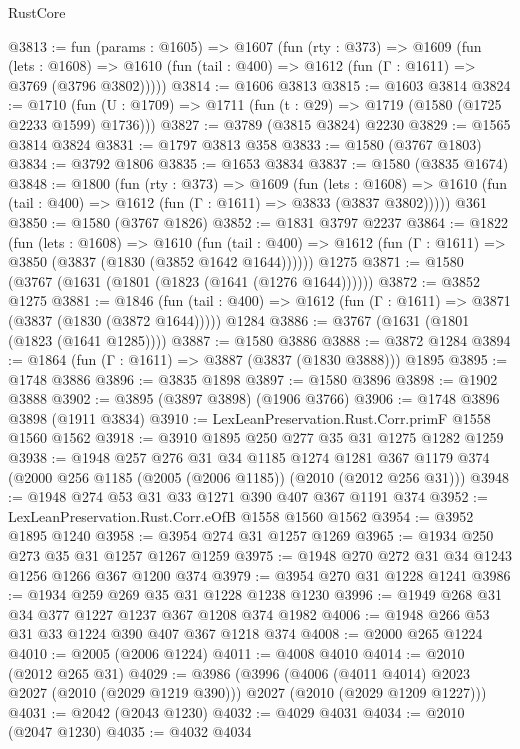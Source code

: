 \begin{lexlean}{RustCore}
\begin{coremodule}
@3813 := fun (params : @1605) =>
  @1607
    (fun (rty : @373) =>
    @1609
      (fun (lets : @1608) =>
      @1610 (fun (tail : @400) => @1612 (fun (Γ : @1611) => @3769 (@3796 @3802)))))
@3814 := @1606 @3813
@3815 := @1603 @3814
@3824 := @1710 (fun (U : @1709) => @1711 (fun (t : @29) => @1719 (@1580 (@1725 @2233 @1599) @1736)))
@3827 := @3789 (@3815 @3824) @2230
@3829 := @1565 @3814 @3824
@3831 := @1797 @3813 @358
@3833 := @1580 (@3767 @1803)
@3834 := @3792 @1806
@3835 := @1653 @3834
@3837 := @1580 (@3835 @1674)
@3848 := @1800
    (fun (rty : @373) =>
    @1609
      (fun (lets : @1608) =>
      @1610 (fun (tail : @400) => @1612 (fun (Γ : @1611) => @3833 (@3837 @3802)))))
    @361
@3850 := @1580 (@3767 @1826)
@3852 := @1831 @3797 @2237
@3864 := @1822
    (fun (lets : @1608) =>
    @1610
      (fun (tail : @400) => @1612 (fun (Γ : @1611) => @3850 (@3837 (@1830 (@3852 @1642 @1644))))))
    @1275
@3871 := @1580 (@3767 (@1631 (@1801 (@1823 (@1641 (@1276 @1644))))))
@3872 := @3852 @1275
@3881 := @1846
    (fun (tail : @400) => @1612 (fun (Γ : @1611) => @3871 (@3837 (@1830 (@3872 @1644)))))
    @1284
@3886 := @3767 (@1631 (@1801 (@1823 (@1641 @1285))))
@3887 := @1580 @3886
@3888 := @3872 @1284
@3894 := @1864 (fun (Γ : @1611) => @3887 (@3837 (@1830 @3888))) @1895
@3895 := @1748 @3886
@3896 := @3835 @1898
@3897 := @1580 @3896
@3898 := @1902 @3888
@3902 := @3895 (@3897 @3898) (@1906 @3766)
@3906 := @1748 @3896 @3898 (@1911 @3834)
@3910 := LexLeanPreservation.Rust.Corr.primF @1558 @1560 @1562
@3918 := @3910 @1895 @250 @277 @35 @31 @1275 @1282 @1259
@3938 := @1948
    @257
    @276
    @31
    @34
    @1185
    @1274
    @1281
    @367
    @1179
    @374
    (@2000 @256 @1185 (@2005 (@2006 @1185)) (@2010 (@2012 @256 @31)))
@3948 := @1948 @274 @53 @31 @33 @1271 @390 @407 @367 @1191 @374
@3952 := LexLeanPreservation.Rust.Corr.eOfB @1558 @1560 @1562
@3954 := @3952 @1895 @1240
@3958 := @3954 @274 @31 @1257 @1269
@3965 := @1934 @250 @273 @35 @31 @1257 @1267 @1259
@3975 := @1948 @270 @272 @31 @34 @1243 @1256 @1266 @367 @1200 @374
@3979 := @3954 @270 @31 @1228 @1241
@3986 := @1934 @259 @269 @35 @31 @1228 @1238 @1230
@3996 := @1949 @268 @31 @34 @377 @1227 @1237 @367 @1208 @374 @1982
@4006 := @1948 @266 @53 @31 @33 @1224 @390 @407 @367 @1218 @374
@4008 := @2000 @265 @1224
@4010 := @2005 (@2006 @1224)
@4011 := @4008 @4010
@4014 := @2010 (@2012 @265 @31)
@4029 := @3986
    (@3996
      (@4006 (@4011 @4014) @2023 @2027 (@2010 (@2029 @1219 @390)))
      @2027
      (@2010 (@2029 @1209 @1227)))
@4031 := @2042 (@2043 @1230)
@4032 := @4029 @4031
@4034 := @2010 (@2047 @1230)
@4035 := @4032 @4034

\end{coremodule}
\end{lexlean}
